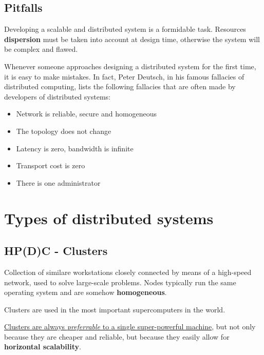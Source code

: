 \subsection{Pitfalls}
Developing a scalable and distributed system is a formidable task.
Resources \textbf{dispersion} must be taken into account at design time, otherwise the system will be complex and flawed.

Whenever someone approaches designing a distributed system for the first time, it is easy to make mistakes. In fact, Peter Deutsch, in his famous fallacies of distributed computing, lists the following fallacies that are often made by developers of distributed systems:
\begin{itemize}
   \item Network is reliable, secure and homogeneous
   \item The topology does not change
   \item Latency is zero, bandwidth is infinite
   \item Transport cost is zero
   \item There is one administrator
\end{itemize}





\section{Types of distributed systems}

\subsection{HP(D)C - Clusters}
Collection of similare workstations closely connected by means of a high-speed network, used to solve large-scale problems.
Nodes typically run the same operating system and are somehow \textbf{homogeneous}.

Clusters are used in the most important supercomputers in the world.

\ul{Clusters are always \textit{preferrable} to a single super-powerful machine}, but not only because they are cheaper and reliable, but because they easily allow for \textbf{horizontal scalability}.

